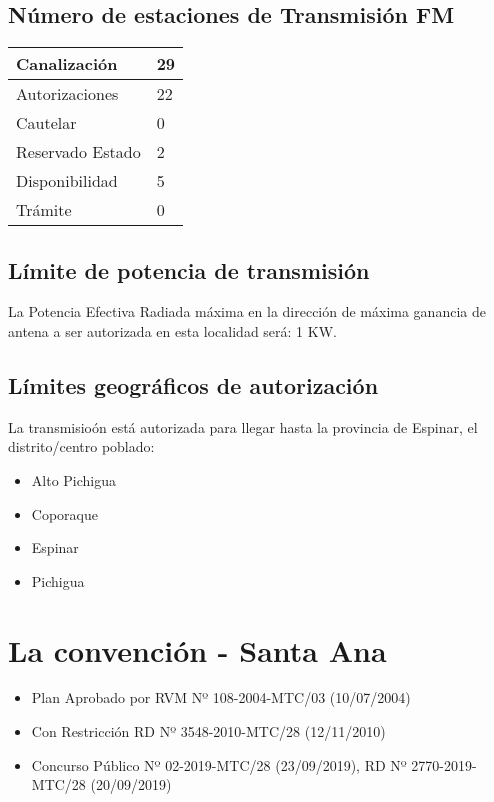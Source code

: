 \documentclass[a4paper]{IEEEtran} %
\begin{document}
\subsection{Número de estaciones de Transmisión FM}

\begin{tabular}{|l|l|} \hline
	Canalización 			& 29 \\ \hline
	Autorizaciones			& 22 \\ \hline
	Cautelar				& 0 \\ \hline
	Reservado Estado		& 2 \\ \hline
	Disponibilidad			& 5 \\ \hline
	Trámite					& 0 \\ \hline 
\end{tabular}

\subsection{Límite de potencia de transmisión}

La Potencia Efectiva Radiada máxima en la dirección de máxima ganancia de antena a ser autorizada en esta localidad será: 1 KW.

\subsection{Límites geográficos de autorización}

La transmisioón está autorizada para llegar hasta la provincia de Espinar, el distrito/centro poblado:

\begin{itemize}
	\item Alto Pichigua
	\item Coporaque
	\item Espinar
	\item Pichigua
\end{itemize}



\section{La convención - Santa Ana}

\begin{itemize}
	\item Plan Aprobado por RVM Nº 108-2004-MTC/03 (10/07/2004)
	\item Con Restricción RD Nº 3548-2010-MTC/28 (12/11/2010)
	\item Concurso Público Nº 02-2019-MTC/28 (23/09/2019), RD Nº 2770-2019-MTC/28 (20/09/2019)
\end{itemize}
\end{document}
